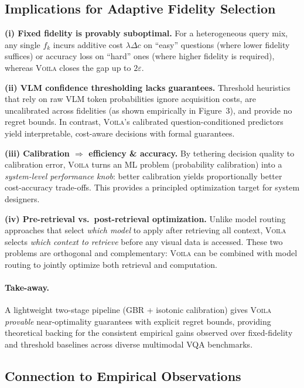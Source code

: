\vspace{-0.3em}
\subsection{Implications for Adaptive Fidelity Selection}
\label{sec:implications}

\textbf{(i) Fixed fidelity is provably suboptimal.}
For a heterogeneous query mix, any single $f_k$ incurs
additive cost $\lambda\Delta c$ on ``easy'' questions (where lower fidelity suffices)
or accuracy loss on ``hard'' ones (where higher fidelity is required),
whereas \textsc{Voila} closes the gap up to $2\varepsilon$.

\textbf{(ii) VLM confidence thresholding lacks guarantees.}
Threshold heuristics that rely on raw VLM token probabilities ignore acquisition costs,
are uncalibrated across fidelities (as shown empirically in Figure~3),
and provide no regret bounds. In contrast, \textsc{Voila}'s calibrated question-conditioned
predictors yield interpretable, cost-aware decisions with formal guarantees.

\textbf{(iii) Calibration $\Rightarrow$ efficiency \& accuracy.}
By tethering decision quality to calibration error, \textsc{Voila} turns an ML
problem (probability calibration) into a \emph{system-level performance knob}:
better calibration yields proportionally better cost-accuracy trade-offs.
This provides a principled optimization target for system designers.

\textbf{(iv) Pre-retrieval vs.\ post-retrieval optimization.}
Unlike model routing approaches that select \emph{which model} to apply after
retrieving all context, \textsc{Voila} selects \emph{which context to retrieve}
before any visual data is accessed. These two problems are orthogonal and complementary:
\textsc{Voila} can be combined with model routing to jointly optimize both retrieval
and computation.

\paragraph{Take-away.}
A lightweight two-stage pipeline (GBR + isotonic calibration) gives \textsc{Voila}
\emph{provable} near-optimality guarantees with explicit regret bounds,
providing theoretical backing for the consistent empirical gains observed
over fixed-fidelity and threshold baselines across diverse multimodal VQA benchmarks.

\vspace{-0.2em}
\subsection{Connection to Empirical Observations}
\label{sec:theory_empirics}

